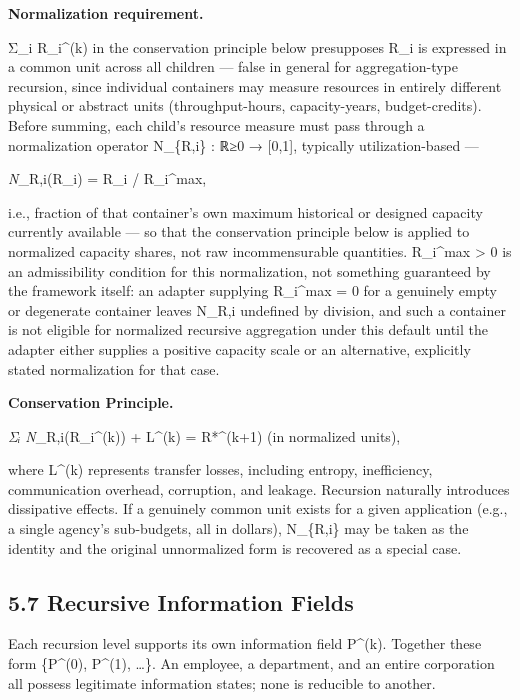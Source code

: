 \documentclass[
]{article}
\begin{document}
\textbf{Normalization requirement.}

Σ\_i R\_i\^{}(k) in the conservation principle below presupposes R\_i is
expressed in a common unit across all children --- false in general for
aggregation-type recursion, since individual containers may measure
resources in entirely different physical or abstract units
(throughput-hours, capacity-years, budget-credits). Before summing, each
child's resource measure must pass through a normalization operator
N\_\{R,i\} : ℝ≥0 → {[}0,1{]}, typically utilization-based ---

\emph{N}\_R,i(R\_i) = R\_i / R\_i\^{}max,

i.e., fraction of that container's own maximum historical or designed
capacity currently available --- so that the conservation principle
below is applied to normalized capacity shares, not raw incommensurable
quantities. R\_i\^{}max \textgreater{} 0 is an admissibility condition
for this normalization, not something guaranteed by the framework
itself: an adapter supplying R\_i\^{}max = 0 for a genuinely empty or
degenerate container leaves N\_R,i undefined by division, and such a
container is not eligible for normalized recursive aggregation under
this default until the adapter either supplies a positive capacity scale
or an alternative, explicitly stated normalization for that case.

\textbf{Conservation Principle.}

\emph{Σᵢ N}\_R,i(R\_i\^{}(k)) + L\^{}(k) = R*\^{}(k+1) (in normalized
units),

where L\^{}(k) represents transfer losses, including entropy,
inefficiency, communication overhead, corruption, and leakage. Recursion
naturally introduces dissipative effects. If a genuinely common unit
exists for a given application (e.g., a single agency's sub-budgets, all
in dollars), N\_\{R,i\} may be taken as the identity and the original
unnormalized form is recovered as a special case.

\hypertarget{recursive-information-fields}{%
\subsection{5.7 Recursive Information
Fields}\label{recursive-information-fields}}

Each recursion level supports its own information field P\^{}(k).
Together these form \{P\^{}(0), P\^{}(1), \ldots\}. An employee, a
department, and an entire corporation all possess legitimate information
states; none is reducible to another.
\end{document}
